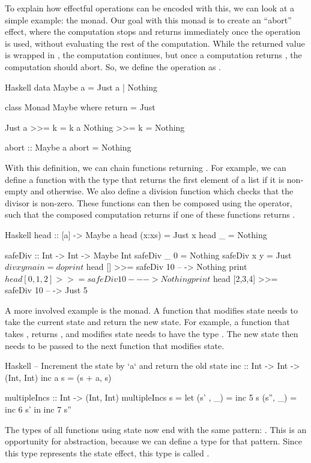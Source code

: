 To explain how effectful operations can be encoded with this, we can look at a simple example: the  monad. Our goal with this monad is to create an ``abort'' effect, where the computation stops and returns immediately once the  operation is used, without evaluating the rest of the computation. While the returned value is wrapped in , the computation continues, but once a computation returns , the computation should abort. So, we define the  operation as .

\begin{lst}{Haskell}
data Maybe a
  = Just a
  | Nothing

class Monad Maybe where
  return = Just
  
  Just a  >>= k = k a
  Nothing >>= k = Nothing

abort :: Maybe a
abort = Nothing
\end{lst}
%
With this definition, we can chain functions returning . For example, we can define a  function with the type  that returns the first element of a list if it is non-empty and  otherwise. We also define a division function which checks that the divisor is non-zero. These functions can then be composed using the \hs{>>=} operator, such that the composed computation returns  if one of these functions returns .

\begin{lst}{Haskell}
head :: [a] -> Maybe a
head (x:xs) = Just x
head _ = Nothing

safeDiv :: Int -> Int -> Maybe Int
safeDiv _ 0 = Nothing
safeDiv x y = Just $ div x y

main = do
  print $ head []      >>= safeDiv 10 -- -> Nothing
  print $ head [0,1,2] >>= safeDiv 10 -- -> Nothing
  print $ head [2,3,4] >>= safeDiv 10 -- -> Just 5
\end{lst}
%
A more involved example is the  monad. A function that modifies state needs to take the current state and return the new state. For example, a function that takes , returns , and modifies state  needs to have the type .
The new state then needs to be passed to the next function that modifies state.

\begin{lst}{Haskell}
-- Increment the state by `a` and return the old state
inc :: Int -> Int -> (Int, Int)
inc a s = (s + a, s)

multipleIncs :: Int -> (Int, Int)
multipleIncs s = let
  (s' , _) = inc 5 s
  (s'', _) = inc 6 s'
  in inc 7 s''
\end{lst}
%
The types of all functions using state now end with the same pattern: . This is an opportunity for abstraction, because we can define a type for that pattern. Since this type represents the state effect, this type is called .

